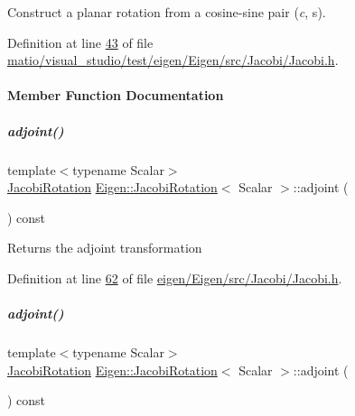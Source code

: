 Construct a planar rotation from a cosine-\/sine pair ({\itshape c}, {\ttfamily s}). 

Definition at line \hyperlink{matio_2visual__studio_2test_2eigen_2_eigen_2src_2_jacobi_2_jacobi_8h_source_l00043}{43} of file \hyperlink{matio_2visual__studio_2test_2eigen_2_eigen_2src_2_jacobi_2_jacobi_8h_source}{matio/visual\+\_\+studio/test/eigen/\+Eigen/src/\+Jacobi/\+Jacobi.\+h}.



\paragraph{Member Function Documentation}
\mbox{\label{group___jacobi___module_a89c8ea615f8fa77ddd5810a1e5fde4da}} 
\subparagraph{\texorpdfstring{adjoint()}{adjoint()}\hspace{0.1cm}{\footnotesize\ttfamily [1/2]}}
{\footnotesize\ttfamily template$<$typename Scalar$>$ \\
\hyperlink{group___jacobi___module_class_eigen_1_1_jacobi_rotation}{Jacobi\+Rotation} \hyperlink{group___jacobi___module_class_eigen_1_1_jacobi_rotation}{Eigen\+::\+Jacobi\+Rotation}$<$ Scalar $>$\+::adjoint (\begin{DoxyParamCaption}{ }\end{DoxyParamCaption}) const\hspace{0.3cm}{\ttfamily [inline]}}

Returns the adjoint transformation 

Definition at line \hyperlink{eigen_2_eigen_2src_2_jacobi_2_jacobi_8h_source_l00062}{62} of file \hyperlink{eigen_2_eigen_2src_2_jacobi_2_jacobi_8h_source}{eigen/\+Eigen/src/\+Jacobi/\+Jacobi.\+h}.

\mbox{\label{group___jacobi___module_a89c8ea615f8fa77ddd5810a1e5fde4da}} 
\subparagraph{\texorpdfstring{adjoint()}{adjoint()}\hspace{0.1cm}{\footnotesize\ttfamily [2/2]}}
{\footnotesize\ttfamily template$<$typename Scalar$>$ \\
\hyperlink{group___jacobi___module_class_eigen_1_1_jacobi_rotation}{Jacobi\+Rotation} \hyperlink{group___jacobi___module_class_eigen_1_1_jacobi_rotation}{Eigen\+::\+Jacobi\+Rotation}$<$ Scalar $>$\+::adjoint (\begin{DoxyParamCaption}{ }\end{DoxyParamCaption}) const\hspace{0.3cm}{\ttfamily [inline]}}

